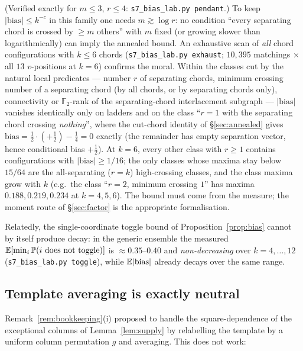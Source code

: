 (Verified exactly for $m\le3$, $r\le4$: \texttt{s7\_bias\_lab.py
pendant}.)  To keep $|\mathrm{bias}|\le k^{-c}$ in this family one
needs $m\gtrsim\log r$: no condition ``every separating chord is
crossed by $\ge m$ others'' with $m$ fixed (or growing slower than
logarithmically) can imply the annealed bound.  An exhaustive scan of
\emph{all} chord configurations with $k\le6$ chords
(\texttt{s7\_bias\_lab.py exhaust}; $10{,}395$ matchings $\times$
all $13$ $v$-positions at $k=6$) confirms the moral.  Within the
classes cut by the natural local predicates --- number $r$ of
separating chords, minimum crossing number of a separating chord (by
all chords, or by separating chords only), connectivity or
$\mathbb{F}_2$-rank of the separating-chord interlacement subgraph
--- $|\mathrm{bias}|$ vanishes identically only on ladders and on
the class ``$r=1$ with the separating chord crossing \emph{nothing}'',
where the cut-chord identity of \S\ref{sec:annealed} gives
$\mathrm{bias}=\tfrac12\cdot(+\tfrac12)-\tfrac14=0$ exactly (the
remainder has empty separation vector, hence conditional bias
$+\tfrac12$).  At $k=6$, every other class with $r\ge1$ contains configurations
with $|\mathrm{bias}|\ge1/16$; the only classes whose maxima stay
below $15/64$ are the all-separating ($r=k$) high-crossing classes,
and the class maxima grow with $k$ (e.g.\ the class ``$r=2$, minimum
crossing $1$'' has maxima $0.188,0.219,0.234$ at $k=4,5,6$).  The bound must come from the measure; the moment
route of \S\ref{sec:factor} is the appropriate formalisation.

Relatedly, the single-coordinate toggle bound of
Proposition~\ref{prop:bias} cannot by itself produce decay: in the
generic ensemble the measured $\mathbb{E}[\min_i\mathbb{P}(i\text{ does not
toggle})]$ is $\approx0.35$--$0.40$ and \emph{non-decreasing} over
$k=4,\dots,12$ (\texttt{s7\_bias\_lab.py toggle}), while
$\mathbb{E}|\mathrm{bias}|$ already decays over the same range.

\subsection{Template averaging is exactly neutral}
\label{sec:vacuity}

Remark~\ref{rem:bookkeeping}(i) proposed to handle the
square-dependence of the exceptional columns of
Lemma~\ref{lem:supply} by relabelling the template by a uniform
column permutation $g$ and averaging.  This does not work:

